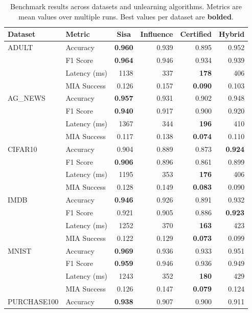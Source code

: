 \begin{table}[t]
\centering
\caption{Benchmark results across datasets and unlearning algorithms. Metrics are mean values over multiple runs. Best values per dataset are \textbf{bolded}.}
\label{tab:main_results}
\small
\setlength{\tabcolsep}{4pt}
\begin{tabular}{llrrrr}
\toprule
Dataset & Metric & \multicolumn{1}{c}{Sisa} & \multicolumn{1}{c}{Influence} & \multicolumn{1}{c}{Certified} & \multicolumn{1}{c}{Hybrid} \\
\midrule
ADULT & Accuracy & \textbf{0.960} & 0.939 & 0.895 & 0.952 \\
 & F1 Score & \textbf{0.964} & 0.946 & 0.934 & 0.939 \\
 & Latency (ms) & 1138 & 337 & \textbf{178} & 406 \\
 & MIA Success & 0.126 & 0.157 & \textbf{0.090} & 0.103 \\
\midrule
AG\_NEWS & Accuracy & \textbf{0.957} & 0.931 & 0.902 & 0.948 \\
 & F1 Score & \textbf{0.940} & 0.917 & 0.900 & 0.920 \\
 & Latency (ms) & 1367 & 344 & \textbf{196} & 410 \\
 & MIA Success & 0.117 & 0.138 & \textbf{0.074} & 0.110 \\
\midrule
CIFAR10 & Accuracy & 0.904 & 0.889 & 0.873 & \textbf{0.924} \\
 & F1 Score & \textbf{0.906} & 0.896 & 0.861 & 0.899 \\
 & Latency (ms) & 1195 & 353 & \textbf{176} & 406 \\
 & MIA Success & 0.128 & 0.149 & \textbf{0.083} & 0.090 \\
\midrule
IMDB & Accuracy & \textbf{0.946} & 0.926 & 0.891 & 0.932 \\
 & F1 Score & 0.921 & 0.905 & 0.886 & \textbf{0.923} \\
 & Latency (ms) & 1252 & 370 & \textbf{163} & 423 \\
 & MIA Success & 0.122 & 0.129 & \textbf{0.073} & 0.099 \\
\midrule
MNIST & Accuracy & \textbf{0.969} & 0.936 & 0.933 & 0.951 \\
 & F1 Score & \textbf{0.959} & 0.946 & 0.936 & 0.949 \\
 & Latency (ms) & 1243 & 352 & \textbf{180} & 429 \\
 & MIA Success & 0.126 & 0.147 & \textbf{0.079} & 0.124 \\
\midrule
PURCHASE100 & Accuracy & \textbf{0.938} & 0.907 & 0.900 & 0.911 \\

\end{tabular}
\end{table}
